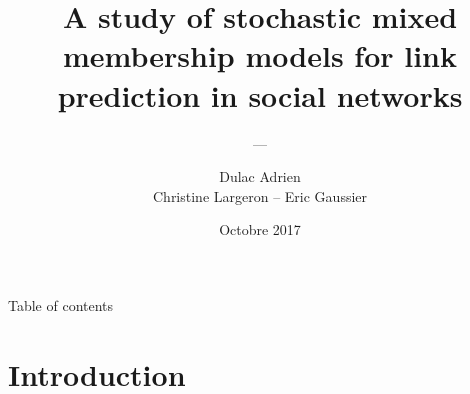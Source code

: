 \title{A study of stochastic mixed membership models for link prediction in social networks}
\subtitle{---\\}
\author[Dulac Adrien]{Dulac Adrien\\[3mm] Christine Largeron -- Eric Gaussier}
\date{Octobre 2017}

\usepackage[backend=bibtex]{biblatex}




\begin{frame}
    \titlepage
     
\end{frame}



\begin{frame}{Table of contents}
    \tableofcontents
\end{frame}


\section{Introduction}

%
%

